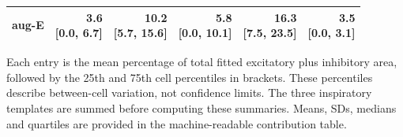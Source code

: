 \begin{table}[htbp]
\begin{tabular}{@{}lrrrrr@{}}
aug-E & \shortstack{3.6\\{}[0.0, 6.7]} & \shortstack{10.2\\{}[5.7, 15.6]} & \shortstack{5.8\\{}[0.0, 10.1]} & \shortstack{16.3\\{}[7.5, 23.5]} & \shortstack{3.5\\{}[0.0, 3.1]} \\[6pt]
\bottomrule
\end{tabular}
\par\smallskip\begin{minipage}{\linewidth}\footnotesize Each entry is the mean percentage of total fitted excitatory plus inhibitory area, followed by the 25th and 75th cell percentiles in brackets. These percentiles describe between-cell variation, not confidence limits. The three inspiratory templates are summed before computing these summaries. Means, SDs, medians and quartiles are provided in the machine-readable contribution table.\end{minipage}
\end{table}

